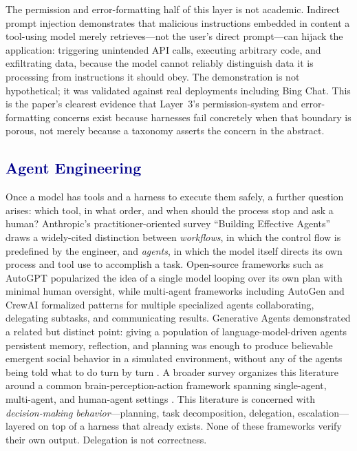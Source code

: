 \documentclass[journal]{IEEEtran}
\begin{document}
The permission and error-formatting half of this layer is not academic. Indirect prompt injection \cite{greshake2023injection} demonstrates that malicious instructions embedded in content a tool-using model merely retrieves---not the user's direct prompt---can hijack the application: triggering unintended API calls, executing arbitrary code, and exfiltrating data, because the model cannot reliably distinguish data it is processing from instructions it should obey. The demonstration is not hypothetical; it was validated against real deployments including Bing Chat. This is the paper's clearest evidence that Layer~3's permission-system and error-formatting concerns exist because harnesses fail concretely when that boundary is porous, not merely because a taxonomy asserts the concern in the abstract.

\subsection{\textcolor{darkblue}{Agent Engineering}}

Once a model has tools and a harness to execute them safely, a further question arises: which tool, in what order, and when should the process stop and ask a human? Anthropic's practitioner-oriented survey ``Building Effective Agents'' \cite{anthropic2024building} draws a widely-cited distinction between \emph{workflows}, in which the control flow is predefined by the engineer, and \emph{agents}, in which the model itself directs its own process and tool use to accomplish a task. Open-source frameworks such as AutoGPT popularized the idea of a single model looping over its own plan with minimal human oversight, while multi-agent frameworks including AutoGen \cite{wu2023autogen} and CrewAI formalized patterns for multiple specialized agents collaborating, delegating subtasks, and communicating results. Generative Agents demonstrated a related but distinct point: giving a population of language-model-driven agents persistent memory, reflection, and planning was enough to produce believable emergent social behavior in a simulated environment, without any of the agents being told what to do turn by turn \cite{park2023generative}. A broader survey organizes this literature around a common brain-perception-action framework spanning single-agent, multi-agent, and human-agent settings \cite{xi2023rise}. This literature is concerned with \emph{decision-making behavior}---planning, task decomposition, delegation, escalation---layered on top of a harness that already exists. None of these frameworks verify their own output. Delegation is not correctness.
\end{document}
